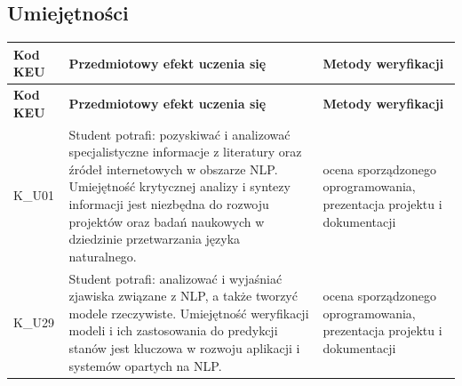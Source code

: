 \documentclass[12pt, a4paper]{article}
\newcommand{\thdrule}{\noalign{\global\setlength{\extrarowheight}{0pt}}}
\newcommand{\thdend}{\noalign{\global\setlength{\extrarowheight}{3pt}}}
\begin{document}
\subsection*{Umiejętności}
{\scriptsize
\begin{longtable}{m{1.6cm}m{9.0cm}m{4.2cm}}
\thdrule\toprule
\rowcolor{pjatkRed} {\color{white}\footnotesize\textbf{\vphantom{Ag}Kod KEU}} & {\color{white}\footnotesize\textbf{\vphantom{Ag}Przedmiotowy efekt uczenia się}} & {\color{white}\footnotesize\textbf{\vphantom{Ag}Metody weryfikacji}} \\
\midrule\thdend
\endfirsthead
\thdrule\toprule
\rowcolor{pjatkRed} {\color{white}\footnotesize\textbf{\vphantom{Ag}Kod KEU}} & {\color{white}\footnotesize\textbf{\vphantom{Ag}Przedmiotowy efekt uczenia się}} & {\color{white}\footnotesize\textbf{\vphantom{Ag}Metody weryfikacji}} \\
\midrule\thdend
\endhead
  \rowcolor{tableRowLight} K\_U01 & Student potrafi: pozyskiwać i analizować specjalistyczne informacje z literatury oraz źródeł internetowych w obszarze NLP. Umiejętność krytycznej analizy i syntezy informacji jest niezbędna do rozwoju projektów oraz badań naukowych w dziedzinie przetwarzania języka naturalnego. & ocena sporządzonego oprogramowania, prezentacja projektu i dokumentacji \\
  \rowcolor{tableRowAlt} K\_U29 & Student potrafi: analizować i wyjaśniać zjawiska związane z NLP, a także tworzyć modele rzeczywiste. Umiejętność weryfikacji modeli i ich zastosowania do predykcji stanów jest kluczowa w rozwoju aplikacji i systemów opartych na NLP. & ocena sporządzonego oprogramowania, prezentacja projektu i dokumentacji \\
\bottomrule
\end{longtable}}
\end{document}
